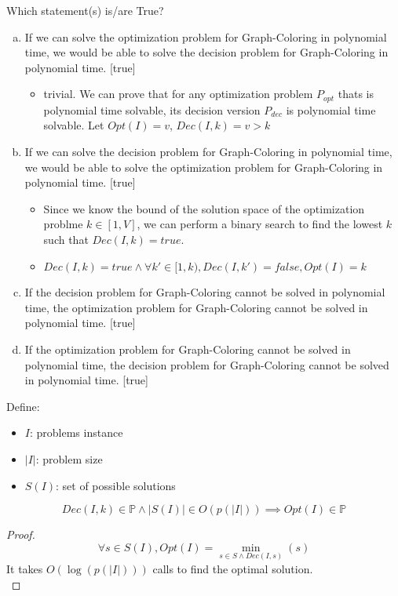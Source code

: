 \documentclass[9pt]{extarticle}
\begin{document}
Which statement(s) is/are True?
\begin{enumerate}[(a)]
    \item If we can solve the optimization problem for Graph-Coloring in polynomial time, we would be able to solve the decision problem for Graph-Coloring in polynomial time. [true]
    \begin{itemize}
      \item trivial. We can prove that for any optimization problem $P_{opt}$ thats is polynomial time solvable, its decision version $P_{dec}$ is polynomial time solvable. 
      Let $Opt(I) = v$, $Dec(I, k) = v > k$
    \end{itemize}
    \item If we can solve the decision problem for Graph-Coloring in polynomial time, we would be able to solve the optimization problem for Graph-Coloring in polynomial time. [true]
    \begin{itemize}
      \item Since we know the bound of the solution space of the optimization problme $k \in [1, V]$, we can perform a binary search to find the lowest $k$ such that $Dec(I, k) = true$. 
      \item $Dec(I, k) = true \land \forall k' \in [1, k), Dec(I, k') = false, Opt(I) = k$
    \end{itemize}
    \item If the decision problem for Graph-Coloring cannot be solved in polynomial time, the optimization problem for Graph-Coloring cannot be solved in polynomial time. [true]
    \item If the optimization problem for Graph-Coloring cannot be solved in polynomial time, the decision problem for Graph-Coloring cannot be solved in polynomial time. [true]
\end{enumerate}
Define: 
\begin{itemize}
  \item $I$: problems instance
  \item $|I|$: problem size
  \item $S(I)$: set of possible solutions
\end{itemize}
\[Dec(I, k) \in \mathbb{P} \land |S(I)| \in O(p(|I|)) \implies Opt(I) \in \mathbb{P} \]
\begin{proof}
  \[\forall s \in S(I), Opt(I) = \min_{s\in S \land Dec(I, s)}(s)\]
  It takes $O(\log(p(|I|)))$ calls to find the optimal solution. \\
\end{proof}
\end{document}
